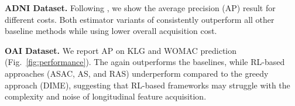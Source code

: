 \textbf{ADNI Dataset.} Following \citet{qin2024risk}, we show the average precision (AP) result for different costs. Both estimator variants of \texttt{\OurMethod} consistently outperform all other baseline methods while using lower overall acquisition cost.

\textbf{OAI Dataset.} We report AP on KLG and WOMAC prediction (Fig.~\ref{fig:performance}). The \texttt{\OurMethod} again outperforms the baselines, while RL-based approaches (ASAC, AS, and RAS) underperform compared to the greedy approach (DIME), suggesting that RL-based frameworks may struggle with the complexity and noise of longitudinal feature acquisition. 
